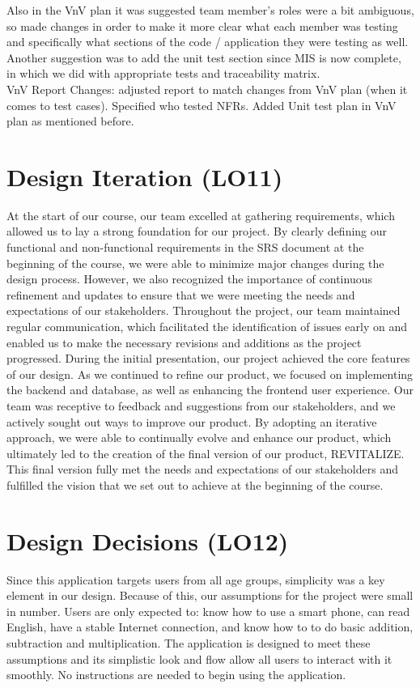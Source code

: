 \documentclass{article}
\begin{document}
Also in the VnV plan it was suggested team member's roles were a bit ambiguous, so made changes in order to make it more clear what each member was testing and specifically what sections of the code / application they were testing as well. Another suggestion was to add the unit test section since MIS is now complete, in which we did with appropriate tests and traceability matrix. \\

VnV Report Changes: adjusted report to match changes from VnV plan (when it comes to test cases). Specified who tested NFRs. Added Unit test plan in VnV plan as mentioned before.

\section{Design Iteration (LO11)}

At the start of our course, our team excelled at gathering requirements, which allowed us to lay a strong foundation for our project. By clearly defining our functional and non-functional requirements in the SRS document at the beginning of the course, we were able to minimize major changes during the design process. However, we also recognized the importance of continuous refinement and updates to ensure that we were meeting the needs and expectations of our stakeholders. Throughout the project, our team maintained regular communication, which facilitated the identification of issues early on and enabled us to make the necessary revisions and additions as the project progressed. During the initial presentation, our project achieved the core features of our design. As we continued to refine our product, we focused on implementing the backend and database, as well as enhancing the frontend user experience. Our team was receptive to feedback and suggestions from our stakeholders, and we actively sought out ways to improve our product. By adopting an iterative approach, we were able to continually evolve and enhance our product, which ultimately led to the creation of the final version of our product, REVITALIZE. This final version fully met the needs and expectations of our stakeholders and fulfilled the vision that we set out to achieve at the beginning of the course.

\section{Design Decisions (LO12)}
Since this application targets users from all age groups, simplicity was a key element in our design. Because of this, our assumptions for the project were small in number. Users are only expected to: know how to use a smart phone, can read English, have a stable Internet connection, and know how to to do basic addition, subtraction and multiplication. The application is designed to meet these assumptions and its simplistic look and flow allow all users to interact with it smoothly. No instructions are needed to begin using the application. 
\end{document}
